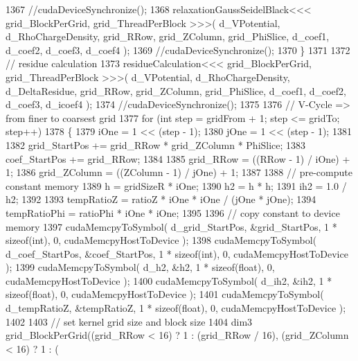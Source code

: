 \begin{DoxyCode}
1367             \textcolor{comment}{//cudaDeviceSynchronize();}
1368             relaxationGaussSeidelBlack<<< grid\_BlockPerGrid, grid\_ThreadPerBlock >>>( d\_VPotential, 
      d\_RhoChargeDensity, grid\_RRow, grid\_ZColumn, grid\_PhiSlice, d\_coef1, d\_coef2, d\_coef3, d\_coef4 );
1369             \textcolor{comment}{//cudaDeviceSynchronize();}
1370         \}
1371 
1372         \textcolor{comment}{// residue calculation}
1373         residueCalculation<<< grid\_BlockPerGrid, grid\_ThreadPerBlock >>>( d\_VPotential, d\_RhoChargeDensity,
       d\_DeltaResidue, grid\_RRow, grid\_ZColumn, grid\_PhiSlice, d\_coef1, d\_coef2, d\_coef3, d\_icoef4 );
1374         \textcolor{comment}{//cudaDeviceSynchronize();}
1375 
1376         \textcolor{comment}{// V-Cycle => from finer to coarsest grid}
1377         \textcolor{keywordflow}{for} (\textcolor{keywordtype}{int} step = gridFrom + 1; step <= gridTo; step++)
1378         \{
1379             iOne = 1 << (step - 1); 
1380             jOne = 1 << (step - 1);
1381 
1382             grid\_StartPos += grid\_RRow * grid\_ZColumn * PhiSlice;
1383             coef\_StartPos += grid\_RRow;
1384 
1385             grid\_RRow       = ((RRow - 1) / iOne) + 1;
1386             grid\_ZColumn    = ((ZColumn - 1) / jOne) + 1;
1387 
1388             \textcolor{comment}{// pre-compute constant memory}
1389             h   = gridSizeR * iOne;
1390             h2  = h * h;
1391             ih2 = 1.0 / h2;
1392 
1393             tempRatioZ = ratioZ * iOne * iOne / (jOne * jOne);
1394             tempRatioPhi = ratioPhi * iOne * iOne;
1395 
1396             \textcolor{comment}{// copy constant to device memory}
1397             cudaMemcpyToSymbol( d\_grid\_StartPos, &grid\_StartPos, 1 * \textcolor{keyword}{sizeof}(\textcolor{keywordtype}{int}), 0, cudaMemcpyHostToDevice
       );
1398             cudaMemcpyToSymbol( d\_coef\_StartPos, &coef\_StartPos, 1 * \textcolor{keyword}{sizeof}(\textcolor{keywordtype}{int}), 0, cudaMemcpyHostToDevice
       );
1399             cudaMemcpyToSymbol( d\_h2, &h2, 1 * \textcolor{keyword}{sizeof}(\textcolor{keywordtype}{float}), 0, cudaMemcpyHostToDevice );
1400             cudaMemcpyToSymbol( d\_ih2, &ih2, 1 * \textcolor{keyword}{sizeof}(\textcolor{keywordtype}{float}), 0, cudaMemcpyHostToDevice );
1401             cudaMemcpyToSymbol( d\_tempRatioZ, &tempRatioZ, 1 * \textcolor{keyword}{sizeof}(\textcolor{keywordtype}{float}), 0, cudaMemcpyHostToDevice );
1402 
1403             \textcolor{comment}{// set kernel grid size and block size}
1404             dim3 grid\_BlockPerGrid((grid\_RRow < 16) ? 1 : (grid\_RRow / 16), (grid\_ZColumn < 16) ? 1 : (

\end{DoxyCode}
